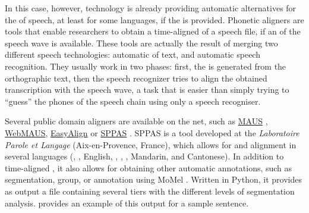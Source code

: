 \documentclass[output=paper]{langsci/langscibook}
\begin{document}
In this case, however, technology is already providing automatic alternatives for the  of speech, at least for some languages, if the  is provided. Phonetic aligners are tools that enable researchers to obtain a time-aligned  of a speech file, if an  of the speech wave is available. These tools are actually the result of merging two different speech technologies: automatic  of text, and automatic speech recognition. They usually work in two phases: first, the  is generated from the orthographic text, then the speech recognizer tries to align the obtained transcription with the speech wave, a task that is easier than simply trying to ``guess'' the phones of the speech chain using only a speech recogniser. 

Several public domain  aligners are available on the net, such as \href{http://www.bas.uni-muenchen.de/Bas/BasMAUS.html}{MAUS} \citep{Schiel1999}, \href{https://clarin.phonetik.uni-muenchen.de/BASWebServices/index.html}{WebMAUS},  \href{http://latlcui.unige.ch/phonetique/easyalign.php}{EasyAlign} \citep{Goldman2011} or \href{http://www.sppas.org/}{SPPAS} \citep{Bigi2015}. \mbox{SPPAS} is a tool developed at the \textit{Laboratoire Parole et Langage} (Aix-en-Provence, France), which allows for  and alignment in several languages (, , English, , , , Mandarin, and Cantonese). In addition to time-aligned , it also allows for obtaining other automatic annotations, such as  segmentation,  group, or  annotation using MoMel \citep{Hirst1993}. Written in Python, it provides as output a  \citep{Boersma.praat}  file containing several tiers with the different levels of segmentation analysis.  provides an example of this output for a sample  sentence.

  
 
\end{document}
